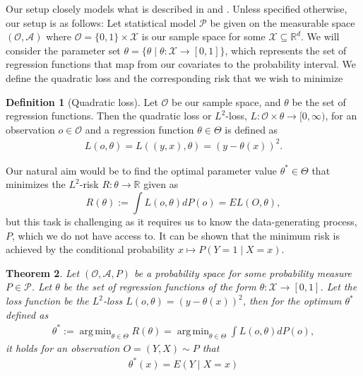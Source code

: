 \documentclass[11pt, a4paper]{article}
\DeclareMathOperator*{\argmin}{arg\,min}
\newtheorem{theorem}{Theorem}
\theoremstyle{definition}
\newtheorem{definition}[theorem]{Definition}
\theoremstyle{remark}
\newcommand{\btheta}{\theta}
\begin{document}
Our setup closely models what is described in \cite{vaart06} and \cite{laan03}. Unless specified otherwise, our setup is as follows:
Let statistical model $ \mathcal{P} $ be given on the measurable space $ (\mathcal{O}, \mathcal{A}) $ where $ \mathcal{O} = \{0,1\} \times \mathcal{X} $ is our sample space for some $ \mathcal{X} \subseteq \mathbb{R}^{d} $. 
We will consider the parameter set $ \btheta = \{\btheta \mid \btheta : \mathcal{X} \to [0,1]\} $, which represents the set of regression functions that map from our covariates to the probability interval. We define the quadratic loss and the corresponding risk that we wish to minimize 
\begin{definition}[Quadratic loss]
    Let $ \mathcal{O}  $ be our sample space, and $ \btheta $ be the set of regression functions. Then the quadratic loss or $ L^2 $-loss, $ L : \mathcal{O} \times \btheta \to [0, \infty) $, for an observation $ o \in \mathcal{O} $ and a regression function $ \btheta \in \Theta $ is defined as 
\begin{align*}
    L(o, \btheta) = L((y,x), \btheta) = (y - \btheta(x))^2.
\end{align*}
\end{definition}
Our natural aim would be to find the optimal parameter value $\btheta^* \in \Theta$ that minimizes the $L^2$-risk $R: \btheta \to \mathbb{R}$ given as 
\begin{equation} \label{l2risk}
    R(\btheta) := \int L(o, \btheta)  dP(o) = EL(O, \btheta),
\end{equation}
but this task is challenging as it requires us to know the data-generating process, $ P $, which we do not have access to. It can be shown that the minimum risk is achieved by the conditional probability $ x \mapsto P(Y = 1\mid X = x) $. 
\begin{theorem}
    Let $ (\mathcal{O} , \mathcal{A}, P) $ be a probability space for some probability measure $ P \in \mathcal{P} $. Let $ \btheta $ be the set of regression functions of the form $ \btheta : \mathcal{X} \to [0,1] $. Let the loss function be the $ L^2 $-loss $ L(o, \btheta) = (y - \btheta(x))^2 $, then for the optimum $ \btheta^* $ defined as 
    \begin{align*}
        \btheta^* := \argmin_{\btheta \in \Theta} R(\btheta)= \argmin_{\btheta \in \Theta} \int L(o, \btheta)  dP(o),
    \end{align*}
    it holds for an observation $ O = (Y, X) \sim P $ that
    \begin{align*}
        \btheta^{*}(x) = E(Y \mid X = x) 
    \end{align*}
\end{theorem}
\end{document}
